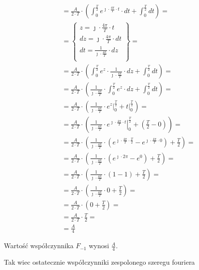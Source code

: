 \begin{task}
\begin{align*}
&=\frac{A}{2\cdot T}\cdot \left( \int_{0}^{\frac{T}{2}} e^{\jmath \cdot \frac{4\pi}{T} \cdot t } \cdot dt + \int_{0}^{\frac{T}{2}} dt\right)=\\
&=\begin{Bmatrix}
z=\jmath \cdot \frac{4\pi}{T} \cdot t \\
dz=\jmath \cdot \frac{4\pi}{T} \cdot dt \\
dt=\frac{1}{\jmath \cdot \frac{4\pi}{T}} \cdot dz \\
\end{Bmatrix}=\\
&=\frac{A}{2\cdot T}\cdot \left( \int_{0}^{\frac{T}{2}} e^{z } \cdot \frac{1}{\jmath \cdot \frac{4\pi}{T}}\cdot dz + \int_{0}^{\frac{T}{2}} dt \right)=\\
&=\frac{A}{2\cdot T}\cdot \left(\frac{1}{\jmath \cdot \frac{4\pi}{T}}\cdot \int_{0}^{\frac{T}{2}} e^{z} \cdot dz + \int_{0}^{\frac{T}{2}} dt\right)=\\
&=\frac{A}{2\cdot T}\cdot \left( \frac{1}{\jmath \cdot \frac{4\pi}{T}}\cdot \left. e^{z} \right|_{0}^{\frac{T}{2}} + \left. t \right|_{0}^{\frac{T}{2}}\right)=\\
&=\frac{A}{2\cdot T}\cdot \left( \frac{1}{\jmath \cdot \frac{4\pi}{T}}\cdot \left. e^{\jmath \cdot \frac{4\pi}{T} \cdot t} \right|_{0}^{\frac{T}{2}} + \left(\frac{T}{2} - 0 \right) \right)=\\
&=\frac{A}{2\cdot T}\cdot \left( \frac{1}{\jmath \cdot \frac{4\pi}{T}}\cdot \left( e^{\jmath \cdot \frac{4\pi}{T} \cdot \frac{T}{2}} - e^{\jmath \cdot \frac{4\pi}{T} \cdot 0}\right) + \frac{T}{2} \right)=\\
&=\frac{A}{2\cdot T}\cdot \left( \frac{1}{\jmath \cdot \frac{4\pi}{T}}\cdot \left( e^{\jmath \cdot 2\pi} - e^{0}\right) + \frac{T}{2} \right)=\\
&=\frac{A}{2\cdot T}\cdot \left( \frac{1}{\jmath \cdot \frac{4\pi}{T}}\cdot \left( 1 - 1\right) + \frac{T}{2} \right)=\\
&=\frac{A}{2\cdot T}\cdot \left( \frac{1}{\jmath \cdot \frac{4\pi}{T}}\cdot 0 + \frac{T}{2} \right)=\\
&=\frac{A}{2\cdot T}\cdot \left(  0 + \frac{T}{2} \right)=\\
&=\frac{A}{2\cdot T}\cdot \frac{T}{2} =\\
&=\frac{A}{4}
\end{align*}

Wartość współczynnika $F_{-1}$ wynosi $\frac{A}{4}$.

Tak wiec ostatecznie współczynniki zespolonego szeregu fouriera 


\end{task}
